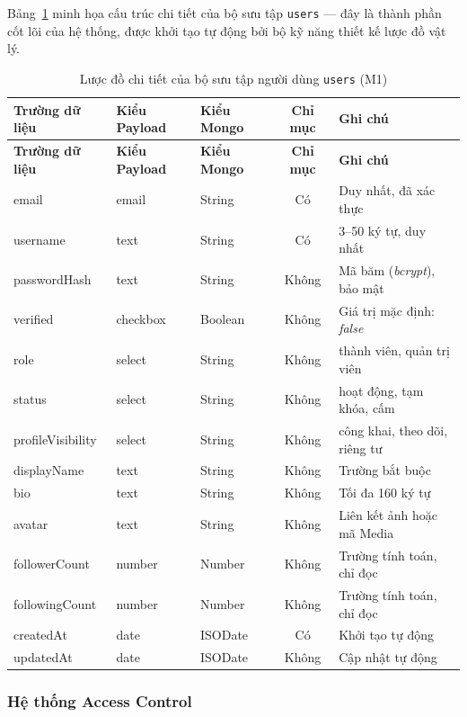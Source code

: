 \documentclass[13pt,a4paper,oneside]{extreport}
\numberwithin{equation}{chapter}
\numberwithin{figure}{chapter}
\numberwithin{table}{chapter}
\begin{document}
Bảng~\ref{tab:users-schema} minh họa cấu trúc chi tiết của bộ sưu tập \texttt{users} — đây là thành phần cốt lõi của hệ thống, được khởi tạo tự động bởi bộ kỹ năng thiết kế lược đồ vật lý.

\begin{longtable}{|p{3.5cm}|p{2cm}|p{2cm}|c|p{3.5cm}|}
\caption{Lược đồ chi tiết của bộ sưu tập người dùng \texttt{users} (M1)} \label{tab:users-schema} \\
\hline
\textbf{Trường dữ liệu} & \textbf{Kiểu Payload} & \textbf{Kiểu Mongo} & \textbf{Chỉ mục} & \textbf{Ghi chú} \\
\hline
\endfirsthead
\hline
\textbf{Trường dữ liệu} & \textbf{Kiểu Payload} & \textbf{Kiểu Mongo} & \textbf{Chỉ mục} & \textbf{Ghi chú} \\
\hline
\endhead
email & email & String & Có & Duy nhất, đã xác thực \\
\hline
username & text & String & Có & 3--50 ký tự, duy nhất \\
\hline
passwordHash & text & String & Không & Mã băm (\textit{bcrypt}), bảo mật \\
\hline
verified & checkbox & Boolean & Không & Giá trị mặc định: \textit{false} \\
\hline
role & select & String & Không & thành viên, quản trị viên \\
\hline
status & select & String & Không & hoạt động, tạm khóa, cấm \\
\hline
profileVisibility & select & String & Không & công khai, theo dõi, riêng tư \\
\hline
displayName & text & String & Không & Trường bắt buộc \\
\hline
bio & text & String & Không & Tối đa 160 ký tự \\
\hline
avatar & text & String & Không & Liên kết ảnh hoặc mã Media \\
\hline
followerCount & number & Number & Không & Trường tính toán, chỉ đọc \\
\hline
followingCount & number & Number & Không & Trường tính toán, chỉ đọc \\
\hline
createdAt & date & ISODate & Có & Khởi tạo tự động \\
\hline
updatedAt & date & ISODate & Không & Cập nhật tự động \\
\hline
\end{longtable}

\subsubsection{Hệ thống Access Control}
\end{document}
